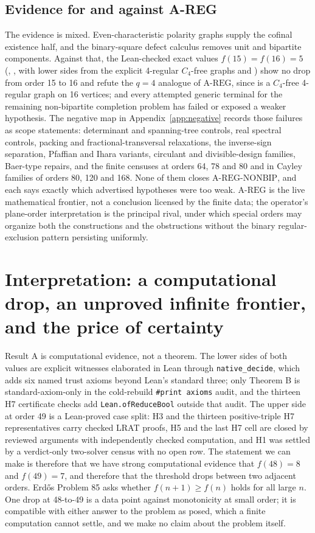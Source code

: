 \documentclass{anvil-paper}
\newcommand{\AREG}{\mathrm{A\text{-}REG}}
\newcommand{\NONBIP}{\mathrm{A\text{-}REG\text{-}NONBIP}}
\theoremstyle{definition}
\begin{document}
\subsection{Evidence for and against A-REG}\label{sec:areg-evidence}

The evidence is mixed. Even-characteristic polarity graphs supply the cofinal existence half, and the binary-square defect calculus removes unit and bipartite components. Against that, the Lean-checked exact values $f(15)=f(16)=5$ (, , with lower sides from the explicit 4-regular $C_4$-free graphs  and ) show no drop from order 15 to 16 and refute the $q=4$ analogue of $\AREG$, since  is a $C_4$-free 4-regular graph on 16 vertices; and every attempted generic terminal for the remaining non-bipartite completion problem has failed or exposed a weaker hypothesis. The negative map in Appendix~\ref{app:negative} records those failures as scope statements: determinant and spanning-tree controls, real spectral controls, packing and fractional-transversal relaxations, the inverse-sign separation, Pfaffian and Ihara variants, circulant and divisible-design families, Baer-type repairs, and the finite censuses at orders 64, 78 and 80 and in Cayley families of orders 80, 120 and 168. None of them closes $\NONBIP$, and each says exactly which advertised hypotheses were too weak. $\AREG$ is the live mathematical frontier, not a conclusion licensed by the finite data; the operator's plane-order interpretation is the principal rival, under which special orders may organize both the constructions and the obstructions without the binary regular-exclusion pattern persisting uniformly.

\section{Interpretation: a computational drop, an unproved infinite frontier, and the price of certainty}\label{sec:interpretation}

Result A is computational evidence, not a theorem. The lower sides of both values are explicit witnesses elaborated in Lean through \texttt{native\_decide}, which adds six named trust axioms beyond Lean's standard three; only Theorem B is standard-axiom-only in the cold-rebuild \texttt{\#print axioms} audit, and the thirteen H7 certificate checks add \texttt{Lean.ofReduceBool} outside that audit. The upper side at order 49 is a Lean-proved case split: H3 and the thirteen positive-triple H7 representatives carry checked LRAT proofs, H5 and the last H7 cell are closed by reviewed arguments with independently checked computation, and H1 was settled by a verdict-only two-solver census with no open row. The statement we can make is therefore that we have strong computational evidence that $f(48)=8$ and $f(49)=7$, and therefore that the threshold drops between two adjacent orders. Erdős Problem 85 asks whether $f(n+1)\ge f(n)$ holds for all large $n$. One drop at 48-to-49 is a data point against monotonicity at small order; it is compatible with either answer to the problem as posed, which a finite computation cannot settle, and we make no claim about the problem itself.
\end{document}

